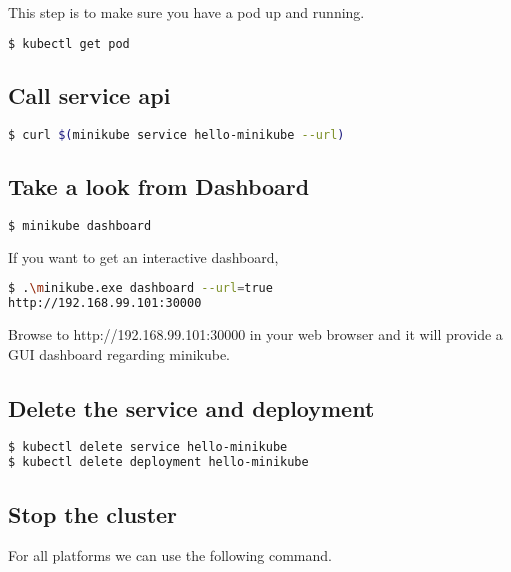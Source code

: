 This step is to make sure you have a pod up and running.

\begin{lstlisting}[language=bash]
$ kubectl get pod
\end{lstlisting}

\subsection{Call service api}\label{call-service-api}

\begin{lstlisting}[language=bash]
$ curl $(minikube service hello-minikube --url)
\end{lstlisting}

\subsection{Take a look from
Dashboard}\label{take-a-look-from-dashboard}

\begin{lstlisting}[language=bash]
$ minikube dashboard
\end{lstlisting}

If you want to get an interactive dashboard,

\begin{lstlisting}[language=bash]
$ .\minikube.exe dashboard --url=true
http://192.168.99.101:30000
\end{lstlisting}

Browse to http://192.168.99.101:30000 in your web browser and it will
provide a GUI dashboard regarding minikube.

\subsection{Delete the service and
deployment}\label{delete-the-service-and-deployment}

\begin{lstlisting}[language=bash]
$ kubectl delete service hello-minikube
$ kubectl delete deployment hello-minikube
\end{lstlisting}

\subsection{Stop the cluster}\label{stop-the-cluster}

For all platforms we can use the following command.

